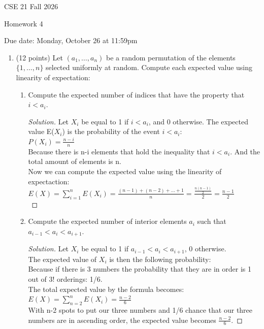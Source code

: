 \documentclass[10pt,letterpaper,unboxed,cm]{article}
\newenvironment{solution}
  {\begin{proof}[Solution]}
  {\end{proof}}
\begin{document}
\hfill{CSE 21 Fall 2026}

\hfill{Homework 4}

\hfill{Due date: Monday, October 26 at 11:59pm}



\begin{enumerate}
\item (12 points)
Let $(a_1,\dots,a_n)$ be a random permutation of the elements $\{1,\dots,n\}$ selected uniformly at random. Compute each expected value using linearity of expectation:


\begin{enumerate}
\item
Compute the expected number of indices that have the property that $i<a_i$.

\begin{solution}
    Let $X_i$ be equal to 1 if $i < a_i$, and 0 otherwise. 
    The expected value E($X_i$) is the probability of the event $i < a_i$:\\
    \(P(X_i)=\frac{n-i}{n}\) \\
    Because there is n-i elements that hold the inequality that $i < a_i$. And the total amount of elements is n.\\
    Now we can compute the expected value using the linearity of expectaction:\\
    \(E(X) = \sum_{i=1}^{n} E(X_i) = \frac{(n-1)+(n-2)+\dots+1}{n} = \frac{\frac{n(n-1)}{2}}{2} = \boxed{\frac{n-1}{2}}\)\\
\end{solution}
\item
Compute the expected number of interior elements $a_i$ such that $a_{i-1}<a_i<a_{i+1}$.

\begin{solution}
    
    Let $X_i$ be equal to 1 if $a_{i-1} < a_i < a_{i+1}$, 0 otherwise.\\
    The expected value of $X_i$ is then the following probability:\\
    Because if there is 3 numbers the probability that they are in order is 1 out of 3! orderings: 1/6.\\
    The total expected value by the formula becomes:\\
    \(E(X) = \sum_{n=2}^{n} E(X_i) = \boxed{\frac{n-2}{6}}\)\\
    With n-2 spots to put our three numbers and 1/6 chance that our three numbers are in ascending order, the expected value becomes $\frac{n-2}{6}$. 
\end{solution}


\end{enumerate}
\end{enumerate}
\end{document}
